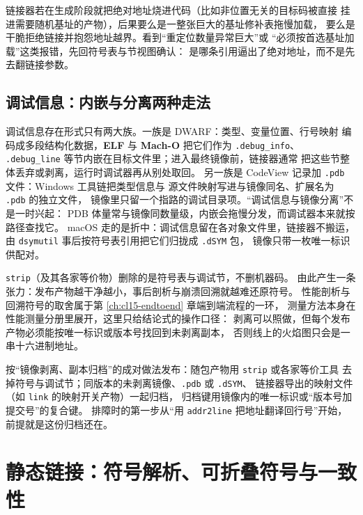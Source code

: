 \documentclass[12pt,a4paper,fontset=fandol]{ctexbook}
\newcommand{\Tp}[1]{\texttt{#1}}
\newcommand{\Tool}[1]{\texttt{#1}}
\newcommand{\Sect}[1]{\texttt{.#1}}
\newcommand{\Mx}[1]{\textsf{#1}}
\newcommand{\Elf}{\textbf{\textsf{ELF}}}
\newcommand{\Macho}{\textbf{\textsf{Mach-O}}}
\newcommand{\Win}{\textsf{Windows}}
\newcommand{\Mac}{\textsf{macOS}}
\begin{document}
\begin{warning}[title={绝对寻址让镜像失去可重定位性}]
链接器若在生成阶段就把绝对地址烧进代码（比如非位置无关的目标码被直接
挂进需要随机基址的产物），后果要么是一整张巨大的基址修补表拖慢加载，
要么是干脆拒绝链接并抱怨地址越界。看到“重定位数量异常巨大”或
“必须按首选基址加载”这类报错，先回符号表与节视图确认：
是哪条引用逼出了绝对地址，而不是先去翻链接参数。
\end{warning}

\section{调试信息：内嵌与分离两种走法}\label{sec:cl07-debug}

调试信息存在形式只有两大族。一族是 \Mx{DWARF}：类型、变量位置、行号映射
编码成多段结构化数据，\Elf{} 与 \Macho{} 把它们作为 \Sect{debug\_info}、
\Sect{debug\_line} 等节内嵌在目标文件里；进入最终镜像前，链接器通常
把这些节整体丢弃或剥离，运行时调试器再从别处取回。
另一族是 \Mx{CodeView} 记录加 \Tp{.pdb} 文件：\Win{} 工具链把类型信息与
源文件映射写进与镜像同名、扩展名为 \Tp{.pdb} 的独立文件，
镜像里只留一个指路的调试目录项。“调试信息与镜像分离”不是一时兴起：
\Mx{PDB} 体量常与镜像同数量级，内嵌会拖慢分发，而调试器本来就按路径查找它。
\Mac{} 走的是折中：调试信息留在各对象文件里，链接器不搬运，
由 \Tool{dsymutil} 事后按符号表引用把它们归拢成 \Tp{.dSYM} 包，
镜像只带一枚唯一标识供配对。

\Tool{strip}（及其各家等价物）删除的是符号表与调试节，不删机器码。
由此产生一条张力：发布产物越干净越小，事后剖析与崩溃回溯就越难还原符号。
性能剖析与回溯符号的取舍属于第 \ref{ch:cl15-endtoend} 章端到端流程的一环，
测量方法本身在性能测量分册里展开，这里只给结论式的操作口径：
剥离可以照做，但每个发布产物必须能按唯一标识或版本号找回到未剥离副本，
否则线上的火焰图只会是一串十六进制地址。

\begin{bestpractice}[title={发布产物的符号保全}]
按“镜像剥离、副本归档”的成对做法发布：随包产物用 \Tool{strip} 或各家等价工具
去掉符号与调试节；同版本的未剥离镜像、\Tp{.pdb} 或 \Tp{.dSYM}、
链接器导出的映射文件（如 \Tool{link} 的映射开关产物）一起归档，
归档键用镜像内的唯一标识或“版本号加提交号”的复合键。
排障时的第一步从“用 \Tool{addr2line} 把地址翻译回行号”开始，
前提就是这份归档还在。
\end{bestpractice}

\chapter{静态链接：符号解析、可折叠符号与一致性}\label{ch:cl08-static-link}
\end{document}
